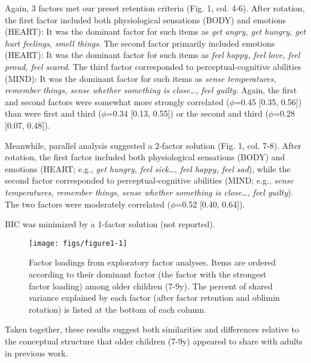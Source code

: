 \documentclass[10pt, letterpaper]{article}
\newenvironment{CodeChunk}{}{}
\begin{document}
Again, 3 factors met our preset retention criteria (Fig. 1, col. 4-6).
After rotation, the first factor included both physiological sensations
(BODY) and emotions (HEART): It was the dominant factor for such items
as \emph{get angry, get hungry, get hurt feelings, smell things}. The
second factor primarily included emotions (HEART): It was the dominant
factor for such items as \emph{feel happy, feel love, feel proud, feel
scared}. The third factor corresponded to perceptual-cognitive abilities
(MIND): It was the dominant factor for such items as \emph{sense
temperatures, remember things, sense whether something is close\ldots{},
feel guilty}. Again, the first and second factors were somewhat more
strongly correlated (\(\phi\)=0.45 {[}0.35, 0.56{]}) than were first and
third (\(\phi\)=0.34 {[}0.13, 0.55{]}) or the second and third
(\(\phi\)=0.28 {[}0.07, 0.48{]}).

Meanwhile, parallel analysis suggested a 2-factor solution (Fig. 1, col.
7-8). After rotation, the first factor included both physiological
sensations (BODY) and emotions (HEART; e.g., \emph{get hungry, feel
sick\ldots{}, feel happy, feel sad}), while the second factor
corresponded to perceptual-cognitive abilities (MIND; e.g., \emph{sense
temperatures, remember things, sense whether something is close\ldots{},
feel guilty}). The two factors were moderately correlated (\(\phi\)=0.52
{[}0.40, 0.64{]}).

BIC was minimized by a 1-factor solution (not reported).

\begin{CodeChunk}
\begin{figure*}[tb]

{\centering \texttt{[image: figs/figure1-1]} 

}

\caption[Factor loadings from exploratory factor analyses]{Factor loadings from exploratory factor analyses. Items are ordered according to their dominant factor (the factor with the strongest factor loading) among older children (7-9y). The percent of shared variance explained by each factor (after factor retention and oblimin rotation) is listed at the bottom of each column.}\label{fig:figure1}
\end{figure*}
\end{CodeChunk}

Taken together, these results suggest both similarities and differences
relative to the conceptual structure that older children (7-9y) appeared
to share with adults in previous work.
\end{document}
